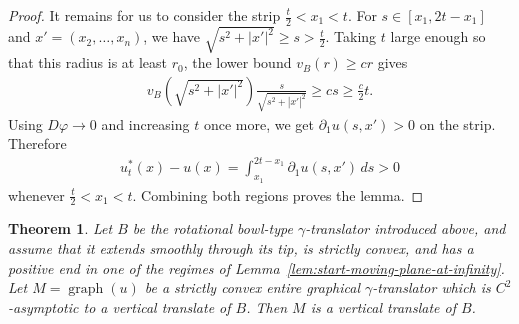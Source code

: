 \documentclass{amsart}
\theoremstyle{plain}
\newtheorem{theorem}{Theorem}[section]
\theoremstyle{mainintrothm}
\theoremstyle{definition}
\begin{document}
\begin{proof}
		It remains for us to consider the strip $\frac{t}{2}<x_1<t$.  For
		$s\in[x_1,2t-x_1]$ and $x'=(x_2,\ldots,x_n)$, we have
		$\sqrt{s^2+|x'|^2}\ge s>\frac{t}{2}$.  Taking $t$ large enough so that this
		radius is at least $r_0$, the lower bound $v_B(r)\ge cr$ gives
		\begin{align*}
			v_B\left(\sqrt{s^2+|x'|^2}\right)
			\frac{s}{\sqrt{s^2+|x'|^2}}
			\ge
			cs
			\ge
			\frac{c}{2}t .
		\end{align*}
		Using $D\varphi\to0$ and increasing $t$ once more, we get
		$\partial_1u(s,x')>0$ on the strip.  Therefore
		\begin{align*}
			u_t^*(x)-u(x)
			=
			\int_{x_1}^{2t-x_1}\partial_1u(s,x')\,ds
			>
			0
		\end{align*}
		whenever $\frac{t}{2}<x_1<t$.  Combining both regions proves the lemma.
	\end{proof}
	
\begin{theorem}
	\label{thm:bowl-asymptotic-uniqueness}
	Let $B$ be the rotational bowl-type $\gamma$-translator introduced above, and
	assume that it extends smoothly through its tip, is strictly convex, and has a
	positive end in one of the regimes of
	Lemma~\ref{lem:start-moving-plane-at-infinity}.  Let
	$M=\operatorname{graph}(u)$ be a strictly convex entire graphical
	$\gamma$-translator which is $C^2$-asymptotic to a vertical translate of $B$.
	Then $M$ is a vertical translate of $B$.
\end{theorem}
\end{document}
